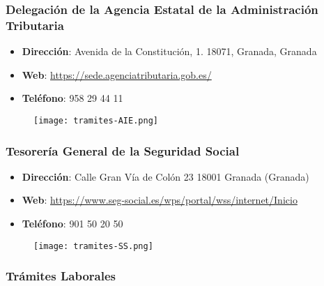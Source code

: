 \subsubsection*{Delegación de la Agencia Estatal de la Administración Tributaria}
\begin{itemize}
    \item \textbf{Dirección}: Avenida de la Constitución, 1. 18071, Granada, Granada
    \item \textbf{Web}: \url{https://sede.agenciatributaria.gob.es/}
    \item \textbf{Teléfono}: 958 29 44 11
\end{itemize}

\begin{figure}[H]
    \centering
    \texttt{[image: tramites-AIE.png]}
\end{figure}

\subsubsection*{Tesorería General de la Seguridad Social}
\begin{itemize}
    \item \textbf{Dirección}: Calle Gran Vía de Colón 23 18001 Granada (Granada)
    \item \textbf{Web}: \url{https://www.seg-social.es/wps/portal/wss/internet/Inicio}
    \item \textbf{Teléfono}: 901 50 20 50
\end{itemize}

\begin{figure}[H]
    \centering
    \texttt{[image: tramites-SS.png]}
\end{figure}

\subsubsection*{Trámites Laborales}

